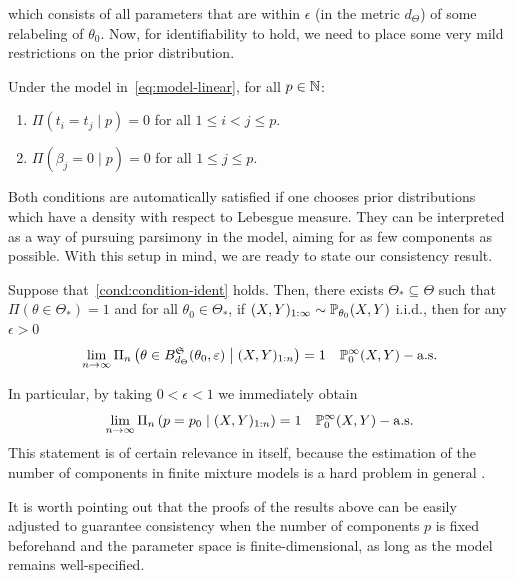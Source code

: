 which consists of all parameters that are within \(\epsilon\) (in the metric \(d_\Theta\)) of some relabeling of \(\theta_0\). Now, for identifiability to hold, we need to place some very mild restrictions on the prior distribution.
\begin{assumption} Under the model in~\eqref{eq:model-linear}, for all \(p\in\mathbb{N}\):\label{cond:condition-ident}
  \begin{enumerate}[label=(\roman*)]
    \item \(\Pi(t_i=t_j\mid p)=0\) for all \(1\leq i < j \leq p\).
    \item \(\Pi(\beta_j=0 \mid p)=0\) for all \(1\leq j \leq p\).
  \end{enumerate}
\end{assumption}
Both conditions are automatically satisfied if one chooses prior distributions which have a density with respect to Lebesgue measure. They can be interpreted as a way of pursuing parsimony in the model, aiming for as few components as possible. With this setup in mind, we are ready to state our consistency result.

\begin{theorem}\label{th:consistency-doob-linear}
  Suppose that~\ref{cond:condition-ident} holds. Then, there exists \(\Theta_*\subseteq \Theta\) such that \(\Pi(\theta \in \Theta_*)=1\) and for all \(\theta_0\in\Theta_*\), if \((X,Y)_{1:\infty} \sim \mathbb{P}_{\theta_0}(X,Y)\) i.i.d., then for any \(\epsilon > 0\)
  \[
    \lim_{n\to\infty} \Pi_n\left(\theta \in B_{d_\Theta}^{\mathfrak{S}}(\theta_0, \varepsilon) \mathrel{\big\vert} (X,Y)_{1:n}\right) = 1 \quad \mathbb{P}_{0}^\infty(X,Y)-\text{a.s.}
  \]
\end{theorem}

\begin{remark}
  In particular, by taking \(0<\epsilon<1\) we immediately obtain  
  \[
    \lim_{n\to\infty} \Pi_n\left(p=p_0 \mid (X,Y)_{1:n}\right) = 1 \quad \mathbb{P}_{0}^\infty(X,Y)-\text{a.s.}
  \]
  This statement is of certain relevance in itself, because the estimation of the number of components in finite mixture models is a hard problem in general \citep[see][and references therein]{miller2018mixture, cai2021finite}.
\end{remark}

It is worth pointing out that the proofs of the results above can be easily adjusted to guarantee consistency when the number of components \(p\) is fixed beforehand and the parameter space is finite-dimensional, as long as the model remains well-specified.

